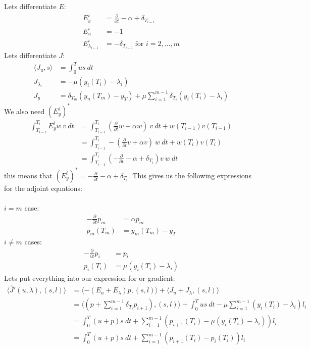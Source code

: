 \documentclass[11pt,a4paper]{report}
\begin{document}
Lets differentiate $E$:
\begin{align*}
E_y^i &= \frac{\partial }{\partial t} - \alpha + \delta_{T_{i-1}} \\
E_u^i &= -1 \\
E_{\lambda_{i-1}}^i &= -\delta_{T_{i-1}} \ \text{for $i=2,...,m$}
\end{align*}
Lets differentiate $J$:
\begin{align*}
\langle J_u,s\rangle &= \int_0^T us \ dt \\
J_{\lambda_i}&= -\mu(y_{i}(T_i)-\lambda_i) \\
J_y &= \delta_{T_{m}}(y_n(T_{m})-y_T) + \mu \sum_{i=1}^{m-1} \delta_{T_{i}}(y_{i}(T_i)-\lambda_i ) 
\end{align*}
We also need $(E_y^i)^*$
\begin{align*}
\int_{T_{i-1}}^{T_{i}} E_y^iw \ v \ dt & = \int_{T_{i-1}}^{T_{i}} (\frac{\partial }{\partial t}w -\alpha w) \ v \ dt + w(T_{i-1})v(T_{i-1}) \\
&= \int_{T_{i-1}}^{T_{i}}-(\frac{\partial }{\partial t}v+\alpha v) \ w \ dt + w(T_{i})v(T_{i}) \\
&= \int_{T_{i-1}}^{T_{i}} (-\frac{\partial }{\partial t}-\alpha + \delta_{T_{i}})v \ w \ dt
\end{align*} 
this means that $(E_y^i)^*=-\frac{\partial }{\partial t}-\alpha + \delta_{T_{i}}$. This gives us the following expressions for the adjoint equations:
\\
\\
$i=m$ case:
\begin{align*}
-\frac{\partial }{\partial t}p_m &=\alpha p_m  \\
p_m(T_{m}) &= y_m(T_{m})-y_T
\end{align*}
$i\neq m$ cases:
\begin{align*}
-\frac{\partial }{\partial t}p_i &=p_i  \\
p_i(T_{i}) &= \mu(y_{i}(T_{i})-\lambda_{i} )
\end{align*}
Lets put everything into our expression for or gradient:
\begin{align*}
\langle \hat{J}'(u,\lambda), (s,l)\rangle&=\langle -(E_u+E_{\lambda})p, (s,l)\rangle + \langle J_u+J_{\lambda}, (s,l)\rangle \\
&= \langle (p+\sum_{i=1}^{m-1} \delta_{T_i}p_{i+1}) , (s,l)\rangle+ \int_0^T us \ dt - \mu \sum_{i=1}^{m-1}(y_{i}(T_i)-\lambda_i)l_i\\
&=\int_0^T (u+p)s \ dt +\sum_{i=1}^{m-1}(p_{i+1}(T_i) -\mu(y_{i}(T_i)-\lambda_i) )l_i \\
&= \int_0^T (u+p)s \ dt +\sum_{i=1}^{m-1}(p_{i+1}(T_i) -p_{i}(T_i) )l_i
\end{align*} 
\end{document}
